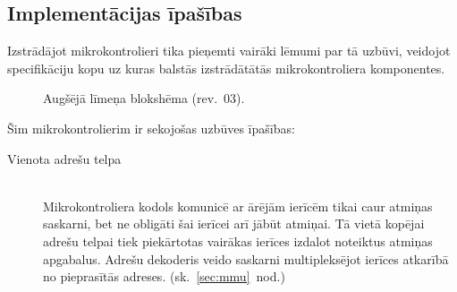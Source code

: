 \subsection{Implementācijas īpašības} \label{sec:design}
Izstrādājot mikrokontrolieri tika pieņemti vairāki lēmumi par tā uzbūvi,
veidojot specifikāciju kopu uz kuras
balstās izstrādātātās mikrokontroliera komponentes. \todo \\
\begin{figure}[bhp]
	\centering
	\def\svgwidth{\textwidth}
	{}
	\caption{Augšējā līmeņa blokshēma (rev.~03).}
	\label{fig:top-rev3}
\end{figure}
Šim mikrokontrolierim ir sekojošas uzbūves īpašības:
\begin{description}
	\item[Vienota adrešu telpa] \hfill \\
		Mikrokontroliera kodols komunicē ar ārējām ierīcēm tikai caur
		atmiņas saskarni, bet ne obligāti šai ierīcei arī jābūt atmiņai.
		Tā vietā kopējai adrešu telpai tiek piekārtotas vairākas ierīces
		izdalot noteiktus atmiņas apgabalus. Adrešu dekoderis veido saskarni
		multipleksējot ierīces atkarībā no pieprasītās adreses.
		(sk.~\ref{sec:mmu}~nod.)
	\item[] \todo
\end{description}
